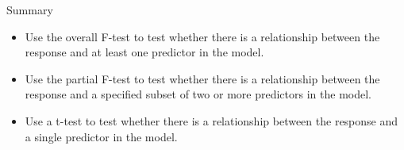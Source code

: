 \documentclass[10pt]{beamer}\usepackage[]{graphicx}\usepackage[]{color}
\begin{document}
\begin{frame}{Summary}
\begin{itemize}
\item Use the overall F-test to test whether there is a relationship between the response and at least one predictor in the model.
\vspace{10pt}

\item Use the partial F-test to test whether there is a relationship between the response and a specified subset of two or more predictors in the model.
\vspace{10pt}

\item Use a t-test to test whether there is a relationship between the response and a single predictor in the model.
\end{itemize}
\end{frame}
\end{document}

